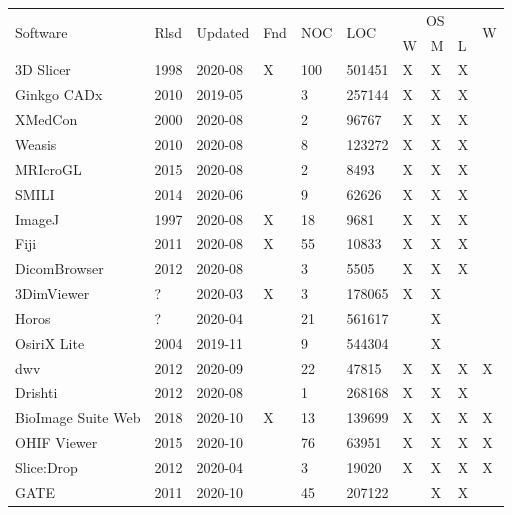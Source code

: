 \begin{table}[H]
\begin{tabular}{llllllllll}
\hline
\multirow{2}{*}{Software} & \multirow{2}{*}{Rlsd} & \multirow{2}{*}{Updated} & \multirow{2}{*}{Fnd} & \multirow{2}{*}{NOC} & \multirow{2}{*}{LOC} & \multicolumn{3}{c}{OS} & \multirow{2}{*}{W} \\ \cline{7-9}
 &  &  &  &  &  & W & M & L &  \\ \hline
3D Slicer \cite{Kikinis2014} & 1998 & 2020-08 & X & 100 & 501451 & X & X & X &  \\
Ginkgo CADx \cite{Wollny2020} & 2010 & 2019-05 &  & 3 & 257144 & X & X & X &  \\
XMedCon \cite{Nolf2003} & 2000 & 2020-08 &  & 2 & 96767 & X & X & X &  \\
Weasis \cite{Roduit2021} & 2010 & 2020-08 &  & 8 & 123272 & X & X & X &  \\
MRIcroGL \cite{Rorden2021} & 2015 & 2020-08 &  & 2 & 8493 & X & X & X &  \\
SMILI \cite{Chandra2018} & 2014 & 2020-06 &  & 9 & 62626 & X & X & X &  \\
ImageJ \cite{Rueden2017} & 1997 & 2020-08 & X & 18 & 9681 & X & X & X &  \\
Fiji \cite{Schindelin2012} & 2011 & 2020-08 & X & 55 & 10833 & X & X & X &  \\
DicomBrowser \cite{Archie2012} & 2012 & 2020-08 &  & 3 & 5505 & X & X & X &  \\
3DimViewer \cite{TESCAN2020} & ? & 2020-03 & X & 3 & 178065 & X & X &  &  \\
Horos \cite{horosproject2020} & ? & 2020-04 &  & 21 & 561617 &  & X &  &  \\
OsiriX Lite \cite{PixmeoSARL2019} & 2004 & 2019-11 &  & 9 & 544304 &  & X &  &  \\
dwv \cite{Martelli2021} & 2012 & 2020-09 &  & 22 & 47815 & X & X & X & X \\
Drishti \cite{Limaye2012} & 2012 & 2020-08 &  & 1 & 268168 & X & X & X &  \\
BioImage Suite Web \cite{Papademetris2005} & 2018 & 2020-10 & X & 13 & 139699 & X & X & X & X \\
OHIF Viewer \cite{Ziegler2020} & 2015 & 2020-10 &  & 76 & 63951 & X & X & X & X \\
Slice:Drop \cite{Haehn2013} & 2012 & 2020-04 &  & 3 & 19020 & X & X & X & X \\
GATE \cite{Jan2004} & 2011 & 2020-10 &  & 45 & 207122 &  & X & X &  \\

\end{tabular}
\end{table}

